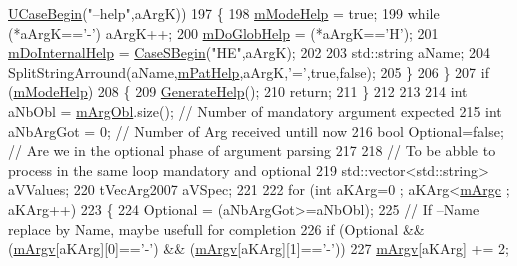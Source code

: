 \begin{DoxyCode}
      \hyperlink{uti__string_8cpp_a595e0d03ab829fd9baf58e036de11e57}{UCaseBegin}(\textcolor{stringliteral}{"--help"},aArgK))
197       \{
198          \hyperlink{classMMVII_1_1cMMVII__Appli_a7b234837f88b35c6067d5dbcff9d6db3}{mModeHelp} = \textcolor{keyword}{true};
199          \textcolor{keywordflow}{while} (*aArgK==\textcolor{charliteral}{'-'}) aArgK++;
200          \hyperlink{classMMVII_1_1cMMVII__Appli_a97b3f1e68ade315956c51bece4c688bf}{mDoGlobHelp} = (*aArgK==\textcolor{charliteral}{'H'});
201          \hyperlink{classMMVII_1_1cMMVII__Appli_aa008743c7dc9a8e761acf4876b2c9a31}{mDoInternalHelp} = \hyperlink{uti__string_8cpp_ad4ca07dc17a92d125e3b11c77f9b44f4}{CaseSBegin}(\textcolor{stringliteral}{"HE"},aArgK);
202 
203          std::string aName; 
204          SplitStringArround(aName,\hyperlink{classMMVII_1_1cMMVII__Appli_a82b6d58979514abe4611a518d948fc4a}{mPatHelp},aArgK,\textcolor{charliteral}{'='},\textcolor{keyword}{true},\textcolor{keyword}{false});
205       \}
206   \}
207   \textcolor{keywordflow}{if} (\hyperlink{classMMVII_1_1cMMVII__Appli_a7b234837f88b35c6067d5dbcff9d6db3}{mModeHelp})
208   \{
209       \hyperlink{classMMVII_1_1cMMVII__Appli_ae11b4082949e6e783025f17ee02bf317}{GenerateHelp}();
210       \textcolor{keywordflow}{return};
211   \}
212 
213 
214   \textcolor{keywordtype}{int} aNbObl = \hyperlink{classMMVII_1_1cMMVII__Appli_a86f7322447bc62804d397f01b9e346c7}{mArgObl}.size(); \textcolor{comment}{//  Number of mandatory argument expected}
215   \textcolor{keywordtype}{int} aNbArgGot = 0; \textcolor{comment}{// Number of  Arg received untill now}
216   \textcolor{keywordtype}{bool} Optional=\textcolor{keyword}{false}; \textcolor{comment}{// Are we in the optional phase of argument parsing}
217 
218   \textcolor{comment}{// To be abble to process in  the same loop mandatory and optional}
219   std::vector<std::string> aVValues;
220   tVecArg2007              aVSpec;
221 
222   \textcolor{keywordflow}{for} (\textcolor{keywordtype}{int} aKArg=0 ; aKArg<\hyperlink{classMMVII_1_1cMMVII__Appli_a6f5d72aa095f192cb6896076e7854bf2}{mArgc} ; aKArg++)
223   \{
224       Optional = (aNbArgGot>=aNbObl);
225       \textcolor{comment}{// If --Name replace by Name, maybe usefull for completion}
226       \textcolor{keywordflow}{if} (Optional && (\hyperlink{classMMVII_1_1cMMVII__Appli_a5dce048e1b8e02d6b27096b9f3ce233e}{mArgv}[aKArg][0]==\textcolor{charliteral}{'-'}) && (\hyperlink{classMMVII_1_1cMMVII__Appli_a5dce048e1b8e02d6b27096b9f3ce233e}{mArgv}[aKArg][1]==\textcolor{charliteral}{'-'}))
227          \hyperlink{classMMVII_1_1cMMVII__Appli_a5dce048e1b8e02d6b27096b9f3ce233e}{mArgv}[aKArg] += 2;

\end{DoxyCode}
